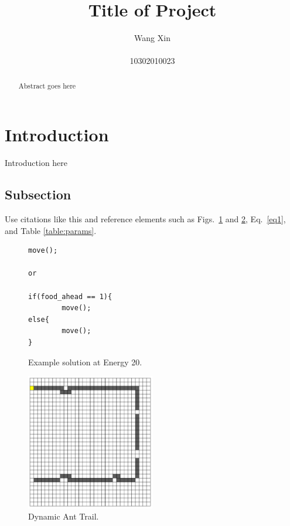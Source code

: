 \documentclass{article}[]
\begin{document}
\title{{\bf Title of Project}\\ }

\author{Wang Xin\\ \vspace{0.5cm}\\
 10302010023}

\date{}
\maketitle
\begin{abstract}
Abstract goes here
\end{abstract}

\section{Introduction}
\label{intro}
Introduction here

\subsection{Subsection}

Use citations like this \cite{Mckay:2010} and reference elements such as
Figs.~\ref{code:ant20} and \ref{fig:trail}, Eq.~\ref{eq1}, and Table
\ref{table:params}.

\begin{figure}
\centering
\begin{verbatim}
move();

or

if(food_ahead == 1){
        move();
else{
        move();
}
\end{verbatim}
\caption{Example solution at Energy 20.}%
\label{code:ant20}%
\end{figure}

\begin{figure}
\centering
\includegraphics[width=0.50\textwidth]{trail.pdf}
\caption{Dynamic Ant Trail.}
\label{fig:trail}
\end{figure}
\end{document}
